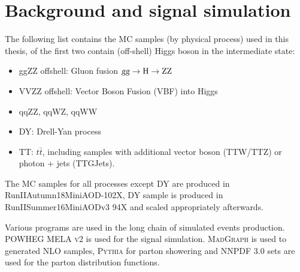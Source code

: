 \section{Background and signal simulation}




The following list contains the MC samples (by physical process) used in this thesis, of the first two
contain (off-shell) Higgs boson in the intermediate state:
\begin{itemize}
\item ggZZ offshell: Gluon fusion $\textsl{g}\textsl{g} \rightarrow\mathrm{H}\rightarrow\mathrm{ZZ}$
\item VVZZ offshell: Vector Boson Fusion (VBF) into Higgs
\item qqZZ, qqWZ, qqWW
\item DY: Drell-Yan process
\item TT: $t\bar{t}$, including samples with additional vector boson (TTW/TTZ) or photon + jets (TTGJets).
\end{itemize}

The MC samples for all processes except DY are produced in RunIIAutumn18MiniAOD-102X,
DY sample is produced in RunIISummer16MiniAODv3 94X and scaled appropriately afterwards.

Various programs are used in the long chain of simulated events production.
\textsc{POWHEG MELA v2}\xspace\cite{POWHEG} is used for the signal simulation.
\textsc{MadGraph}\xspace is used to generated NLO samples, \textsc{Pythia}\xspace for parton
showering and \textsc{NNPDF} 3.0 sets are used for the parton distribution functions.


